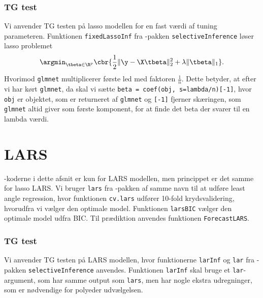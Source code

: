 \subsubsection{TG test} 
Vi anvender TG testen på lasso modellen for en fast værdi af tuning parameteren. 
Funktionen \texttt{fixedLassoInf} fra \Rlang-pakken \texttt{selectiveInference}  løser lasso problemet
\begin{align*}
\argmin_{\tbeta \in \R^p} \cbr{\frac{1}{2} \Vert \y - \X \tbeta \Vert_2^2 + \lambda \Vert \tbeta \Vert_1}.
\end{align*}
Hvorimod \texttt{glmnet} multiplicerer første led med faktoren \(\frac{1}{n}\).
Dette betyder, at efter vi har kørt \texttt{glmnet}, da skal vi sætte \texttt{beta = coef(obj, s=lambda/n)[-1]}, hvor \texttt{obj} er objektet, som er returneret af \texttt{glmnet} og \texttt{[-1]} fjerner skæringen, som \texttt{glmnet} altid giver som første komponent, for at finde det beta der svarer til en lambda værdi.
%
%

\section{LARS} \label{sec:apprkoderlars}
\Rlang-koderne i dette afsnit er kun for LARS modellen, men princippet er det samme for lasso LARS.
Vi bruger \texttt{lars} fra  \Rlang-pakken af samme navn til at udføre least angle regression, hvor funktionen \texttt{cv.lars} udfører 10-fold krydsvalidering, hvorudfra vi vælger den optimale model. 
Funktionen \texttt{larsBIC} vælger den optimale model udfra BIC. 
Til prædiktion anvendes funktionen \texttt{ForecastLARS}.

\subsubsection{TG test} \label{subsubsec:inferens}
Vi anvender TG testen på LARS modellen, hvor funktionerne \texttt{larInf} og \texttt{lar} fra \Rlang-pakken \texttt{selectiveInference} anvendes. 
Funktionen \texttt{larInf} skal bruge et \texttt{lar}-argument, som har samme output som \texttt{lars}, men har nogle ekstra udregninger, som er nødvendige for polyeder udvælgelsen. 



